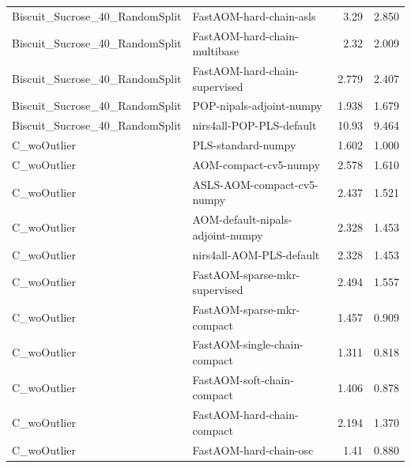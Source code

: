 \begin{landscape}
\begin{longtable}{L{8.0cm}L{9.5cm}rr}
Biscuit\_\allowbreak{}Sucrose\_\allowbreak{}40\_\allowbreak{}RandomSplit & FastAOM-\allowbreak{}hard-\allowbreak{}chain-\allowbreak{}asls & 3.29 & 2.850 \\
Biscuit\_\allowbreak{}Sucrose\_\allowbreak{}40\_\allowbreak{}RandomSplit & FastAOM-\allowbreak{}hard-\allowbreak{}chain-\allowbreak{}multibase & 2.32 & 2.009 \\
Biscuit\_\allowbreak{}Sucrose\_\allowbreak{}40\_\allowbreak{}RandomSplit & FastAOM-\allowbreak{}hard-\allowbreak{}chain-\allowbreak{}supervised & 2.779 & 2.407 \\
Biscuit\_\allowbreak{}Sucrose\_\allowbreak{}40\_\allowbreak{}RandomSplit & POP-\allowbreak{}nipals-\allowbreak{}adjoint-\allowbreak{}numpy & 1.938 & 1.679 \\
Biscuit\_\allowbreak{}Sucrose\_\allowbreak{}40\_\allowbreak{}RandomSplit & nirs4all-\allowbreak{}POP-\allowbreak{}PLS-\allowbreak{}default & 10.93 & 9.464 \\
C\_\allowbreak{}woOutlier & PLS-\allowbreak{}standard-\allowbreak{}numpy & 1.602 & 1.000 \\
C\_\allowbreak{}woOutlier & AOM-\allowbreak{}compact-\allowbreak{}cv5-\allowbreak{}numpy & 2.578 & 1.610 \\
C\_\allowbreak{}woOutlier & ASLS-\allowbreak{}AOM-\allowbreak{}compact-\allowbreak{}cv5-\allowbreak{}numpy & 2.437 & 1.521 \\
C\_\allowbreak{}woOutlier & AOM-\allowbreak{}default-\allowbreak{}nipals-\allowbreak{}adjoint-\allowbreak{}numpy & 2.328 & 1.453 \\
C\_\allowbreak{}woOutlier & nirs4all-\allowbreak{}AOM-\allowbreak{}PLS-\allowbreak{}default & 2.328 & 1.453 \\
C\_\allowbreak{}woOutlier & FastAOM-\allowbreak{}sparse-\allowbreak{}mkr-\allowbreak{}supervised & 2.494 & 1.557 \\
C\_\allowbreak{}woOutlier & FastAOM-\allowbreak{}sparse-\allowbreak{}mkr-\allowbreak{}compact & 1.457 & 0.909 \\
C\_\allowbreak{}woOutlier & FastAOM-\allowbreak{}single-\allowbreak{}chain-\allowbreak{}compact & 1.311 & 0.818 \\
C\_\allowbreak{}woOutlier & FastAOM-\allowbreak{}soft-\allowbreak{}chain-\allowbreak{}compact & 1.406 & 0.878 \\
C\_\allowbreak{}woOutlier & FastAOM-\allowbreak{}hard-\allowbreak{}chain-\allowbreak{}compact & 2.194 & 1.370 \\
C\_\allowbreak{}woOutlier & FastAOM-\allowbreak{}hard-\allowbreak{}chain-\allowbreak{}osc & 1.41 & 0.880 \\

\end{longtable}
\end{landscape}

